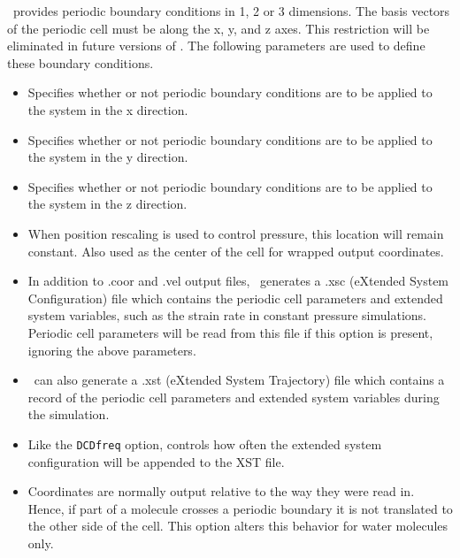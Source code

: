 \NAMD\ provides periodic boundary conditions in 1, 2 or 3 dimensions.
The basis vectors of the periodic cell must be along the x, y, and z axes.  
This restriction will be eliminated in future versions of \NAMD.
The following parameters are used to define these boundary conditions.  

\begin{itemize}

\item
{}
{Specifies whether or not periodic boundary conditions 
are to be applied to the system in the x direction.}

\item
{}
{Specifies whether or not periodic boundary conditions 
are to be applied to the system in the y direction.}

\item
{}
{Specifies whether or not periodic boundary conditions 
are to be applied to the system in the z direction.}

\item
{}
{When position rescaling is used to control pressure, this location will remain constant.  Also used as the center of the cell for wrapped output coordinates.}

\item
{}
{In addition to .coor and .vel output files, \NAMD\ generates a .xsc (eXtended System Configuration) file which contains the periodic cell parameters and extended system variables, such as the strain rate in constant pressure simulations.  Periodic cell parameters will be read from this file if this option is present, ignoring the above parameters.}

\item
{}
{\NAMD\ can also generate a .xst (eXtended System Trajectory) file which contains a record of the periodic cell parameters and extended system variables during the simulation.}

\item
{}
{Like the \verb!DCDfreq! option, controls how often the extended system configuration will be appended to the XST file.}

\item
{}
{Coordinates are normally output relative to the way they were read in.  Hence, if part of a molecule crosses a periodic boundary it is not translated to the other side of the cell.  This option alters this behavior for water molecules only.}

\end{itemize}


